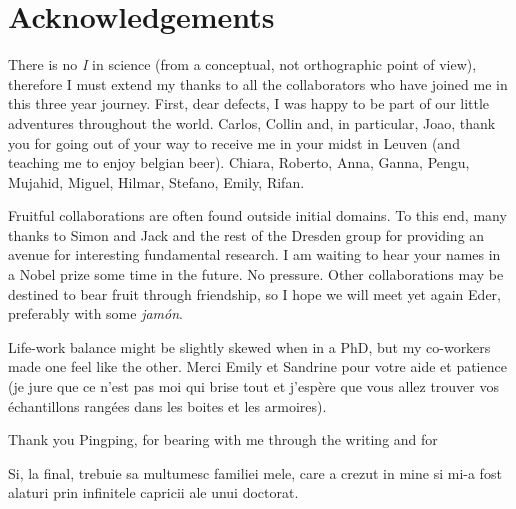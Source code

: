 
\chapter{Acknowledgements}

There is no \textit{I} in science (from a conceptual, not orthographic
point of view), therefore I must extend my thanks to all the collaborators
who have joined me in this three year journey. First, dear defects, 
I was happy to be part of our little adventures throughout the world. 
Carlos, Collin and, in particular, Joao,
thank you for going out of your way to receive me in your midst in Leuven
(and teaching me to enjoy belgian beer).
Chiara, Roberto, Anna, Ganna, Pengu, Mujahid, Miguel, Hilmar, Stefano, Emily, Rifan.

Fruitful collaborations are often found outside initial domains. 
To this end, many thanks to Simon and Jack and the rest of the Dresden 
group for providing an avenue for interesting fundamental research.
I am waiting to hear your names in a Nobel prize some time in the
future. No pressure. Other collaborations may be destined to bear fruit
through friendship, so I hope we will meet yet again Eder, preferably 
with some \textit{jamón}.

Life-work balance might be slightly skewed when in a PhD, but my 
co-workers made one feel like the other. Merci Emily et Sandrine pour
votre aide et patience
(je jure que ce n'est pas moi qui brise tout et j'espère que vous allez
trouver vos échantillons  rangées dans les boites 
et les armoires).

Thank you Pingping, for bearing with me through the writing and for 

Si, la final, trebuie sa multumesc familiei mele, care a crezut in mine si
mi-a fost alaturi prin infinitele capricii ale unui doctorat.